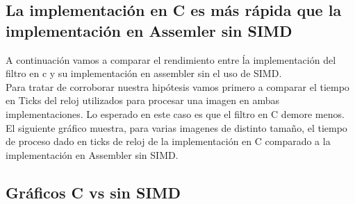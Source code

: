 \subsection{La implementación en C es más rápida que la implementación en Assemler sin SIMD}
 A continuación vamos a comparar el rendimiento entre ĺa implementación del filtro en c y su implementación en assembler sin el uso de SIMD.\\
 Para tratar de corroborar nuestra hipótesis vamos primero a comparar el tiempo en Ticks del reloj utilizados para procesar una imagen en ambas implementaciones.  Lo esperado en este caso es que el filtro en C demore menos. \\ 
 El siguiente gráfico muestra, para varias imagenes de distinto tamaño, el tiempo de proceso dado en ticks de reloj de la implementación en C comparado a la implementación en Assembler sin SIMD. \\

 \subsection{Gráficos C vs sin SIMD}

